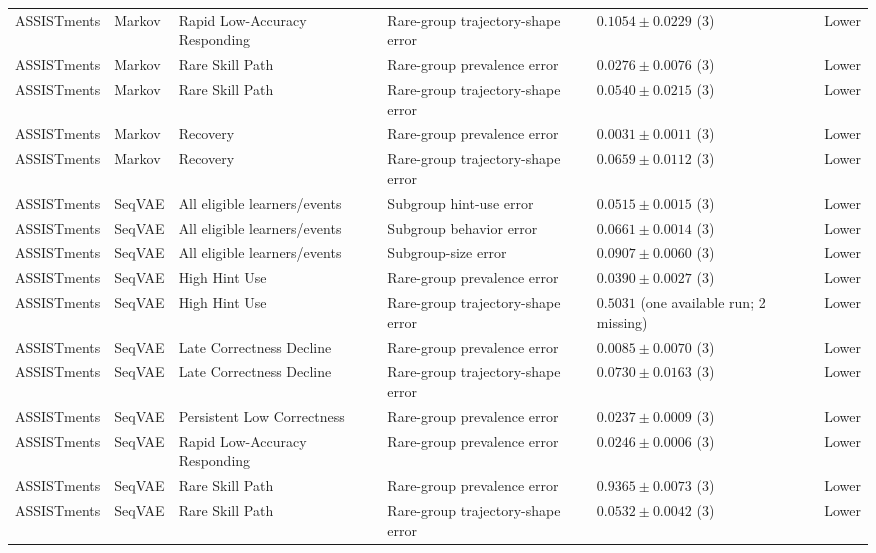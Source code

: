 \begin{longtable}{@{}p{2.25cm}p{2.05cm}p{4.7cm}p{5.0cm}p{2.6cm}p{1.25cm}@{}}
ASSISTments & Markov & Rapid Low-Accuracy Responding & Rare-group trajectory-shape error & $0.1054 \mathbin{\pm} 0.0229$ (3) & Lower \\
ASSISTments & Markov & Rare Skill Path & Rare-group prevalence error & $0.0276 \mathbin{\pm} 0.0076$ (3) & Lower \\
ASSISTments & Markov & Rare Skill Path & Rare-group trajectory-shape error & $0.0540 \mathbin{\pm} 0.0215$ (3) & Lower \\
ASSISTments & Markov & Recovery & Rare-group prevalence error & $0.0031 \mathbin{\pm} 0.0011$ (3) & Lower \\
ASSISTments & Markov & Recovery & Rare-group trajectory-shape error & $0.0659 \mathbin{\pm} 0.0112$ (3) & Lower \\
ASSISTments & SeqVAE & All eligible learners/events & Subgroup hint-use error & $0.0515 \mathbin{\pm} 0.0015$ (3) & Lower \\
ASSISTments & SeqVAE & All eligible learners/events & Subgroup behavior error & $0.0661 \mathbin{\pm} 0.0014$ (3) & Lower \\
ASSISTments & SeqVAE & All eligible learners/events & Subgroup-size error & $0.0907 \mathbin{\pm} 0.0060$ (3) & Lower \\
ASSISTments & SeqVAE & High Hint Use & Rare-group prevalence error & $0.0390 \mathbin{\pm} 0.0027$ (3) & Lower \\
ASSISTments & SeqVAE & High Hint Use & Rare-group trajectory-shape error & $0.5031$ (one available run; 2 missing) & Lower \\
ASSISTments & SeqVAE & Late Correctness Decline & Rare-group prevalence error & $0.0085 \mathbin{\pm} 0.0070$ (3) & Lower \\
ASSISTments & SeqVAE & Late Correctness Decline & Rare-group trajectory-shape error & $0.0730 \mathbin{\pm} 0.0163$ (3) & Lower \\
ASSISTments & SeqVAE & Persistent Low Correctness & Rare-group prevalence error & $0.0237 \mathbin{\pm} 0.0009$ (3) & Lower \\
ASSISTments & SeqVAE & Rapid Low-Accuracy Responding & Rare-group prevalence error & $0.0246 \mathbin{\pm} 0.0006$ (3) & Lower \\
ASSISTments & SeqVAE & Rare Skill Path & Rare-group prevalence error & $0.9365 \mathbin{\pm} 0.0073$ (3) & Lower \\
ASSISTments & SeqVAE & Rare Skill Path & Rare-group trajectory-shape error & $0.0532 \mathbin{\pm} 0.0042$ (3) & Lower \\

\end{longtable}

